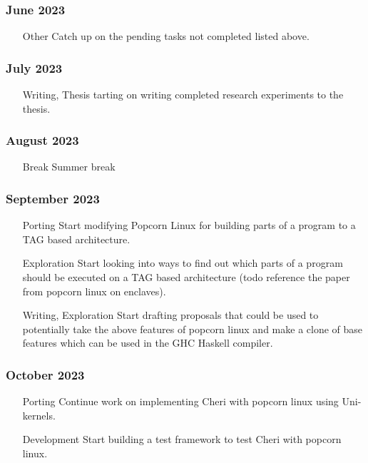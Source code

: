   \subsubsection{June 2023}
  \begin{enumerate}
     \item [Other] Catch up on the pending tasks not completed listed above. 
  \end{enumerate}

  \subsubsection{July 2023}
  \begin{enumerate}
     \item [Writing, Thesis] tarting on writing completed research experiments to the thesis. 
  \end{enumerate}

  \subsubsection{August 2023}
  \begin{enumerate}
    \item [Break] Summer break 
 \end{enumerate}

 \subsubsection{September 2023}
  \begin{enumerate}
    \item [Porting] Start modifying Popcorn Linux for building parts of a program to a TAG based architecture.
    \item [Exploration] Start looking into ways to find out which parts of a program should be executed on a TAG based architecture (todo reference
     the paper from popcorn linux on enclaves).
    \item [Writing, Exploration] Start drafting proposals that could be used to potentially take the above features of popcorn linux and make a clone of 
    base features which can be used in the GHC Haskell compiler.
 \end{enumerate}

 \subsubsection{October 2023}
  \begin{enumerate}
    \item [Porting] Continue work on implementing Cheri with popcorn linux using Uni-kernels. 
    \item [Development] Start building a test framework to test Cheri with popcorn linux.
 \end{enumerate}

